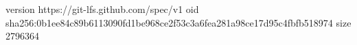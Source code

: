 version https://git-lfs.github.com/spec/v1
oid sha256:0b1ee84c89b6113090fd1be968ce2f53c3a6fea281a98ce17d95c4fbfb518974
size 2796364
